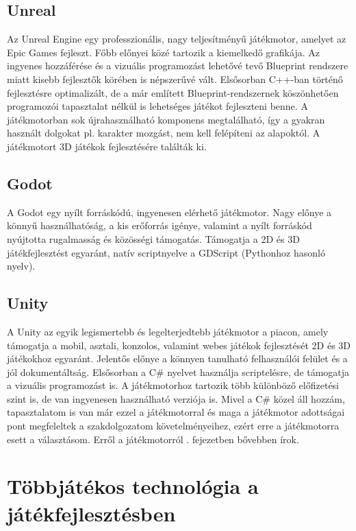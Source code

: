 \documentclass[]{thesis-ekf}
\theoremstyle{definition}
\theoremstyle{remark}
\begin{document}
\subsection{Unreal}

Az Unreal Engine egy professzionális, nagy teljesítményű játékmotor, amelyet az Epic Games fejleszt. Főbb előnyei közé tartozik a kiemelkedő grafikája. Az ingyenes hozzáférése és a vizuális programozást lehetővé tevő Blueprint rendszere miatt kisebb fejlesztők körében is népszerűvé vált. Elsősorban C++-ban történő fejlesztésre optimalizált, de a már említett Blueprint-rendszernek köszönhetően programozói tapasztalat nélkül is lehetséges játékot fejleszteni benne. A játékmotorban sok újrahasználható komponens megtalálható, így a gyakran használt dolgokat pl. karakter mozgást, nem kell felépíteni az alapoktól. A játékmotort 3D játékok fejlesztésére találták ki. \cite{WikipedaiUnreal}

\subsection{Godot}

A Godot egy nyílt forráskódú, ingyenesen elérhető játékmotor. Nagy előnye a könnyű használhatóság, a kis erőforrás igénye, valamint a nyílt forráskód nyújtotta rugalmasság és közösségi támogatás. Támogatja a 2D és 3D játékfejlesztést egyaránt, natív scriptnyelve a GDScript (Pythonhoz hasonló nyelv). \cite{GitHubGodot}

\subsection{Unity}

A Unity az egyik legismertebb és legelterjedtebb játékmotor a piacon, amely támogatja a mobil, asztali, konzolos, valamint webes játékok fejlesztését 2D és 3D játékokhoz egyaránt. Jelentős előnye a könnyen tanulható felhasználói felület és a jól dokumentáltság. Elsősorban a C\# nyelvet használja scriptelésre, de támogatja a vizuális programozást is. A játékmotorhoz tartozik több különböző előfizetési szint is, de van ingyenesen használható verziója is.  Mivel a C\# közel áll hozzám, tapasztalatom is van már ezzel a játékmotorral és maga a játékmotor adottságai pont megfeleltek a szakdolgozatom követelményeihez, ezért erre a játékmotorra esett a választásom. Erről a játékmotorról . fejezetben bővebben írok. \cite{WikipediaUnity}

\section{Többjátékos technológia a játékfejlesztésben}
\end{document}
